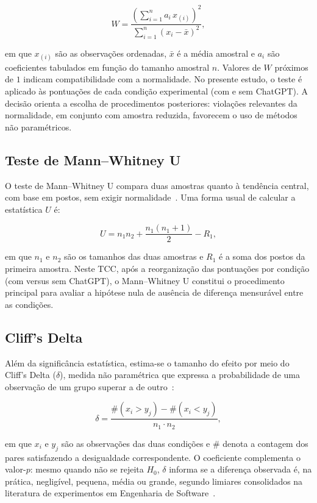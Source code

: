 \begin{equation}
W = \frac{\left(\sum_{i=1}^{n} a_i\, x_{(i)}\right)^{2}}{\sum_{i=1}^{n} (x_i - \bar{x})^{2}},
\end{equation}

em que $x_{(i)}$ são as observações ordenadas, $\bar{x}$ é a média amostral e $a_i$ são coeficientes tabulados em função do tamanho amostral $n$. Valores de $W$ próximos de $1$ indicam compatibilidade com a normalidade. No presente estudo, o teste é aplicado às pontuações de cada condição experimental (com e sem ChatGPT). A decisão orienta a escolha de procedimentos posteriores: violações relevantes da normalidade, em conjunto com amostra reduzida, favorecem o uso de métodos não paramétricos.

\subsection{Teste de Mann--Whitney U}

O teste de Mann--Whitney U compara duas amostras quanto à tendência central, com base em postos, sem exigir normalidade~\cite{sheskin2003handbook,wohlin2012experimentation}. Uma forma usual de calcular a estatística $U$ é:

\begin{equation}
U = n_1 n_2 + \frac{n_1(n_1 + 1)}{2} - R_1,
\end{equation}

em que $n_1$ e $n_2$ são os tamanhos das duas amostras e $R_1$ é a soma dos postos da primeira amostra. Neste TCC, após a reorganização das pontuações por condição (com versus sem ChatGPT), o Mann--Whitney U constitui o procedimento principal para avaliar a hipótese nula de ausência de diferença mensurável entre as condições.

\subsection{Cliff's Delta}

Além da significância estatística, estima-se o tamanho do efeito por meio do Cliff's Delta ($\delta$), medida não paramétrica que expressa a probabilidade de uma observação de um grupo superar a de outro~\cite{kitchenham2019statistical}:

\begin{equation}
\delta = \frac{\#(x_i > y_j) - \#(x_i < y_j)}{n_1 \cdot n_2},
\end{equation}

em que $x_i$ e $y_j$ são as observações das duas condições e $\#$ denota a contagem dos pares satisfazendo a desigualdade correspondente. O coeficiente complementa o valor-$p$: mesmo quando não se rejeita $H_0$, $\delta$ informa se a diferença observada é, na prática, negligível, pequena, média ou grande, segundo limiares consolidados na literatura de experimentos em Engenharia de Software~\cite{kitchenham2019statistical}.

